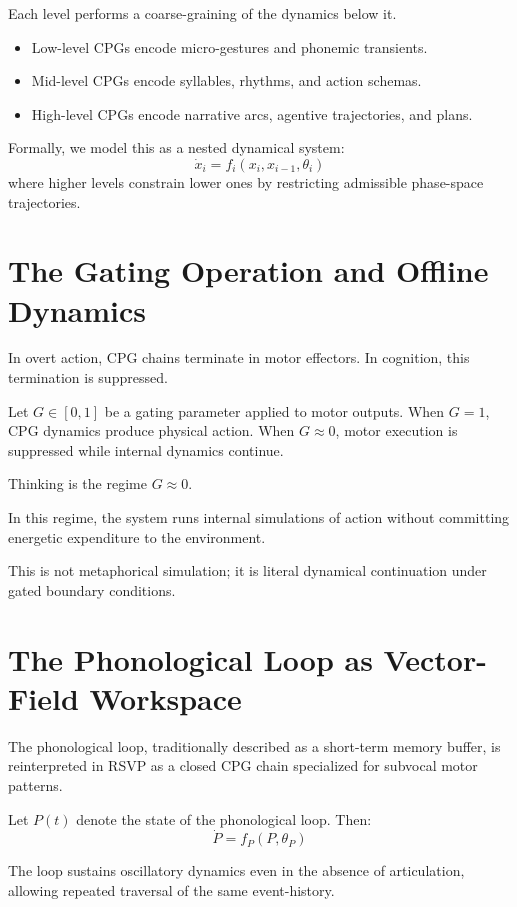 \documentclass[11pt]{book}
\begin{document}
Each level performs a coarse-graining of the dynamics below it.

\begin{itemize}
\item Low-level CPGs encode micro-gestures and phonemic transients.
\item Mid-level CPGs encode syllables, rhythms, and action schemas.
\item High-level CPGs encode narrative arcs, agentive trajectories, and plans.
\end{itemize}

Formally, we model this as a nested dynamical system:
\[
\dot{x}_i = f_i(x_i, x_{i-1}, \theta_i)
\]
where higher levels constrain lower ones by restricting admissible phase-space trajectories.

\section{The Gating Operation and Offline Dynamics}

In overt action, CPG chains terminate in motor effectors. In cognition, this termination is suppressed.

\begin{definition}[Gating]
Let \(G \in [0,1]\) be a gating parameter applied to motor outputs. When \(G = 1\), CPG dynamics produce physical action. When \(G \approx 0\), motor execution is suppressed while internal dynamics continue.
\end{definition}

Thinking is the regime \(G \approx 0\).

In this regime, the system runs internal simulations of action without committing energetic expenditure to the environment.

This is not metaphorical simulation; it is literal dynamical continuation under gated boundary conditions.

\section{The Phonological Loop as Vector-Field Workspace}

The phonological loop, traditionally described as a short-term memory buffer, is reinterpreted in RSVP as a closed CPG chain specialized for subvocal motor patterns.

Let \(P(t)\) denote the state of the phonological loop. Then:
\[
\dot{P} = f_P(P, \theta_P)
\]

The loop sustains oscillatory dynamics even in the absence of articulation, allowing repeated traversal of the same event-history.
\end{document}
